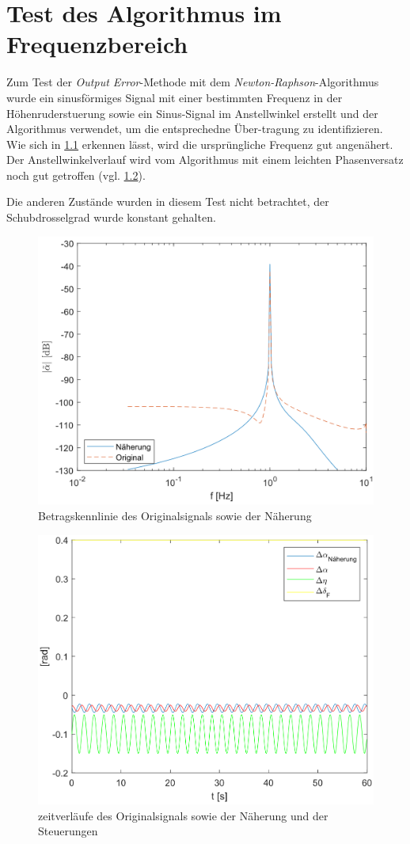 \chapter{Test des Algorithmus im Frequenzbereich}\label{appendix:test_algorithmus}

Zum Test der \textit{Output Error}-Methode mit dem \textit{Newton-Raphson}-Algorithmus wurde ein sinusförmiges Signal 
mit einer bestimmten Frequenz in der Höhenruderstuerung sowie ein Sinus-Signal im Anstellwinkel erstellt und der Algorithmus 
verwendet, um die entsprechedne Über-tragung zu identifizieren. Wie sich in \cref{fig:testdaten1} erkennen lässt, wird die 
ursprüngliche Frequenz gut angenähert. Der Anstellwinkelverlauf wird vom Algorithmus mit einem leichten Phasenversatz noch 
gut getroffen (vgl. \cref{fig:testdaten2}).\par
Die anderen Zustände wurden in diesem Test nicht betrachtet, der Schubdrosselgrad wurde konstant gehalten.

\begin{figure}[!h]
	\centering
	\includegraphics[width=0.6\linewidth]{src/pics/Testdaten1}
	\caption{Betragskennlinie des Originalsignals sowie der Näherung}
	\label{fig:testdaten1}
\end{figure}

\begin{figure}[!h]
	\centering
	\includegraphics[width=0.6\linewidth]{src/pics/Testdaten2}
	\caption{zeitverläufe des Originalsignals sowie der Näherung und der Steuerungen}
	\label{fig:testdaten2}
\end{figure}
